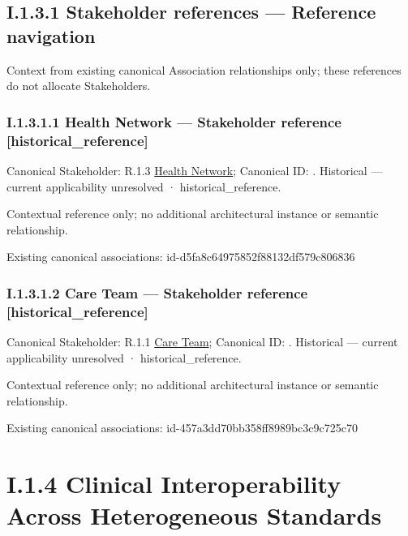 \subsection*{I.1.3.1 Stakeholder references — Reference navigation}
\label{navigation:I.1.3.1}

Context from existing canonical Association relationships only; these references do not allocate Stakeholders.\par
\subsubsection*{I.1.3.1.1 Health Network — Stakeholder reference [historical\_reference]}
\label{navigation:I.1.3.1.1}

{\small Canonical Stakeholder: R.1.3 \hyperref[element:55e57c01dfe146a2a225228b31196862]{Health Network}; Canonical ID: \texttt{}. Historical — current applicability unresolved · historical\_reference.}\par
Contextual reference only; no additional architectural instance or semantic relationship.\par
Existing canonical associations: id-d5fa8c64975852f88132df579c806836\par
\subsubsection*{I.1.3.1.2 Care Team — Stakeholder reference [historical\_reference]}
\label{navigation:I.1.3.1.2}

{\small Canonical Stakeholder: R.1.1 \hyperref[element:6f5a203d81e24a81b384a80781987daa]{Care Team}; Canonical ID: \texttt{}. Historical — current applicability unresolved · historical\_reference.}\par
Contextual reference only; no additional architectural instance or semantic relationship.\par
Existing canonical associations: id-457a3dd70bb358ff8989bc3c9c725c70\par
\section*{I.1.4 Clinical Interoperability Across Heterogeneous Standards}
\label{navigation:I.1.4}

